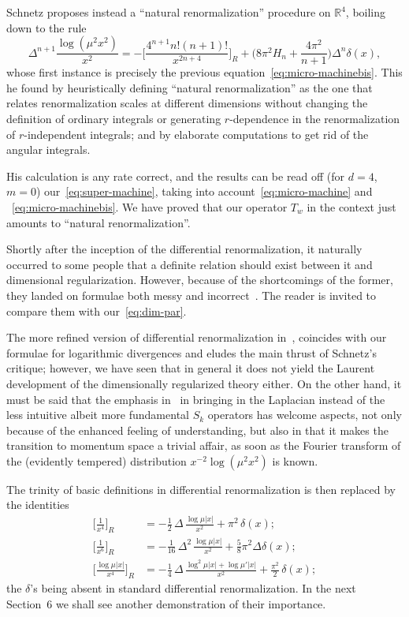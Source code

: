 \documentclass[a4paper,12pt]{article}
\newcommand{\Dl}{\Delta}           %
\newcommand{\dl}{\delta}           %
\newcommand{\R}{\mathbb{R}}        %
\newcommand{\7}{\dagger}           %
\theoremstyle{plain}
\theoremstyle{definition}
\begin{document}
Schnetz proposes instead a ``natural renormalization'' procedure on
$\R^4$, boiling down to the rule
\begin{equation}
\Dl^{n+1}\frac{\log(\mu^2x^2)}{x^2} =
- \biggl[\frac{4^{n+1}n!(n+1)!}{x^{2n+4}}\biggr]_R
+ \biggl(8\pi^2 H_n + \frac{4\pi^2}{n+1}\biggr) \Dl^n\dl(x),
\label{eq:nat-ren}
\end{equation}
whose first instance is precisely the previous
equation~\eqref{eq:micro-machinebis}. This he found by heuristically
defining ``natural renormalization'' as the one that relates
renormalization scales at different dimensions without changing the
definition of ordinary integrals or generating $r$-dependence in the
renormalization of $r$-independent integrals; and by elaborate
computations to get rid of the angular integrals.

His calculation is any rate correct, and the results can be read off
(for $d = 4$, $m = 0$) our~\eqref{eq:super-machine}, taking into
account~\eqref{eq:micro-machine} and ~\eqref{eq:micro-machinebis}. We
have proved that our operator $T_w$ in the context just amounts to
``natural renormalization''.

Shortly after the inception of the differential renormalization, it
naturally occurred to some people that a definite relation should
exist between it and dimensional regularization. However, because of
the shortcomings of the former, they landed on formulae both messy and
incorrect~\cite{DNuria}. The reader is invited to compare them with
our~\eqref{eq:dim-par}.

The more refined version of differential renormalization
in~\cite{SmirZav}, coincides with our formulae for logarithmic
divergences and eludes the main thrust of Schnetz's critique; however,
we have seen that in general it does not yield the Laurent development
of the dimensionally regularized theory either. On the other hand, it
must be said that the emphasis in~\cite{FJL,NR} in bringing in the
Laplacian instead of the less intuitive albeit more fundamental $S_k$
operators has welcome aspects, not only because of the enhanced
feeling of understanding, but also in that it makes the transition to
momentum space a trivial affair, as soon as the Fourier transform of
the (evidently tempered) distribution $x^{-2} \log(\mu^2x^2)$ is
known.

The trinity of basic definitions in differential renormalization is
then replaced by the identities
\begin{align*}
\biggl[\frac{1}{x^4}\biggr]_R
&= - \frac{1}{2} \,\Dl \,\frac{\log\mu|x|}{x^2} + \pi^2\,\dl(x);
\\
\biggl[\frac{1}{x^6}\biggr]_R
&= - \frac{1}{16} \,\Dl^2\, \frac{\log\mu|x|}{x^2}
    + \frac{5}{8} \pi^2 \Dl\dl(x);
\\
\biggl[\frac{\log\mu|x|}{x^4}\biggr]_R
&= - \frac{1}{4} \,\Dl\, \frac{\log^2\mu|x| + \log\mu'|x|}{x^2}
    + \frac{\pi^2}{2} \,\dl(x);
\end{align*}
the $\dl$'s being absent in standard differential renormalization. In
the next Section~6 we shall see another demonstration of their
importance.
\end{document}
